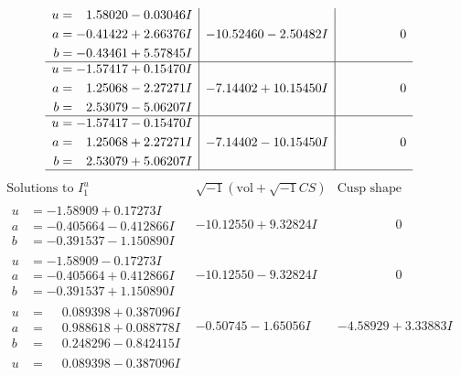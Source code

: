 \documentclass[1p]{elsarticle_modified}
\theoremstyle{definition}
\newcommand{\I}{\sqrt{-1}}
\begin{document}
$$\begin{array}{c|c|c}
\begin{aligned}
u &= \phantom{-}1.58020 - 0.03046 I \\
a &= -0.41422 + 2.66376 I \\
b &= -0.43461 + 5.57845 I\end{aligned}
 & -10.52460 - 2.50482 I & \phantom{-0.000000 } 0 \\ \hline\begin{aligned}
u &= -1.57417 + 0.15470 I \\
a &= \phantom{-}1.25068 - 2.27271 I \\
b &= \phantom{-}2.53079 - 5.06207 I\end{aligned}
 & -7.14402 + 10.15450 I & \phantom{-0.000000 } 0 \\ \hline\begin{aligned}
u &= -1.57417 - 0.15470 I \\
a &= \phantom{-}1.25068 + 2.27271 I \\
b &= \phantom{-}2.53079 + 5.06207 I\end{aligned}
 & -7.14402 - 10.15450 I & \phantom{-0.000000 } 0\\
 \hline 
 \end{array}$$\newpage$$\begin{array}{c|c|c}  
\text{Solutions to }I^u_{1}& \I (\text{vol} + \sqrt{-1}CS) & \text{Cusp shape}\\
 \hline 
\begin{aligned}
u &= -1.58909 + 0.17273 I \\
a &= -0.405664 - 0.412866 I \\
b &= -0.391537 - 1.150890 I\end{aligned}
 & -10.12550 + 9.32824 I & \phantom{-0.000000 } 0 \\ \hline\begin{aligned}
u &= -1.58909 - 0.17273 I \\
a &= -0.405664 + 0.412866 I \\
b &= -0.391537 + 1.150890 I\end{aligned}
 & -10.12550 - 9.32824 I & \phantom{-0.000000 } 0 \\ \hline\begin{aligned}
u &= \phantom{-}0.089398 + 0.387096 I \\
a &= \phantom{-}0.988618 + 0.088778 I \\
b &= \phantom{-}0.248296 - 0.842415 I\end{aligned}
 & -0.50745 - 1.65056 I & -4.58929 + 3.33883 I \\ \hline\begin{aligned}
u &= \phantom{-}0.089398 - 0.387096 I \\

\end{aligned}
\end{array}$$
\end{document}
